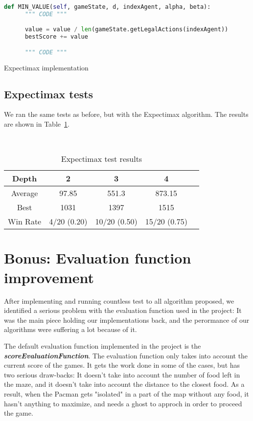 \documentclass{article}
\begin{document}
\begin{table}[!ht]
  \begin{lstlisting}[language=python, frame=tlbr, framesep=6pt, backgroundcolor=\color{light-gray}]
    def MIN_VALUE(self, gameState, d, indexAgent, alpha, beta):
      """ CODE """

      value = value / len(gameState.getLegalActions(indexAgent))
      bestScore += value

      """ CODE """
  \end{lstlisting}
  \caption{Expectimax implementation}
\end{table}

\subsection{Expectimax tests}

We ran the same tests as before, but with the Expectimax algorithm. The results are shown in Table~\ref{tab:expectimax}.

~\\
\begin{table}[!ht]
  \begin{center}
    \begin{tabular}{||c||c|c|c|c||}
      \hline
      Depth & 2 & 3 & 4 \\
      \hline\hline
      Average & 97.85 & 551.3 & 873.15 \\
      \hline\hline
      Best & 1031 & 1397 & 1515 \\
      \hline\hline
      Win Rate & 4/20 (0.20) & 10/20 (0.50) & 15/20 (0.75) \\
      \hline
    \end{tabular}
    \caption{Expectimax test results}
    \label{tab:expectimax}
  \end{center}
\end{table}

\pagebreak
\section{Bonus: Evaluation function improvement}

After implementing and running countless test to all algorithm proposed, we identified a serious problem with the evaluation function used in the project: It was the main piece holding our implementations back, and the perormance of our algorithms were suffering a lot because of it.

The default evaluation function implemented in the project is the \textit{\textbf{scoreEvaluationFunction}}. The evaluation function only takes into account the current score of the games. It gets the work done in some of the cases, but has two serious draw-backs: It doesn't take into account the number of food left in the maze, and it doesn't take into account the distance to the closest food. As a result, when the Pacman gets "isolated" in a part of the map without any food, it hasn't anything to maximize, and needs a ghost to approch in order to proceed the game.
\end{document}
